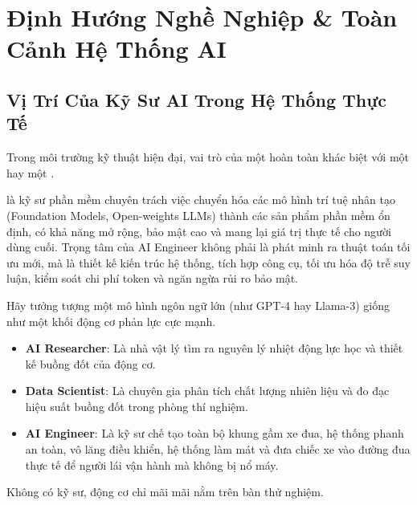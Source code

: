
\chapter{Định Hướng Nghề Nghiệp \& Toàn Cảnh Hệ Thống AI}
\label{ch:phase0-overview}

\section{Vị Trí Của Kỹ Sư AI Trong Hệ Thống Thực Tế}
\label{sec:ai-engineer-role}

Trong môi trường kỹ thuật hiện đại, vai trò của một  hoàn toàn khác biệt với một  hay một .

\begin{definitionbox}
 là kỹ sư phần mềm chuyên trách việc chuyển hóa các mô hình trí tuệ nhân tạo (Foundation Models, Open-weights LLMs) thành các sản phẩm phần mềm ổn định, có khả năng mở rộng, bảo mật cao và mang lại giá trị thực tế cho người dùng cuối. Trọng tâm của AI Engineer không phải là phát minh ra thuật toán tối ưu mới, mà là thiết kế kiến trúc hệ thống, tích hợp công cụ, tối ưu hóa độ trễ suy luận, kiểm soát chi phí token và ngăn ngừa rủi ro bảo mật.
\end{definitionbox}

\begin{intuitionbox}
Hãy tưởng tượng một mô hình ngôn ngữ lớn (như GPT-4 hay Llama-3) giống như một khối động cơ phản lực cực mạnh.
\begin{itemize}
  \item \textbf{AI Researcher}: Là nhà vật lý tìm ra nguyên lý nhiệt động lực học và thiết kế buồng đốt của động cơ.
  \item \textbf{Data Scientist}: Là chuyên gia phân tích chất lượng nhiên liệu và đo đạc hiệu suất buồng đốt trong phòng thí nghiệm.
  \item \textbf{AI Engineer}: Là kỹ sư chế tạo toàn bộ khung gầm xe đua, hệ thống phanh an toàn, vô lăng điều khiển, hệ thống làm mát và đưa chiếc xe vào đường đua thực tế để người lái vận hành mà không bị nổ máy.
\end{itemize}
Không có kỹ sư, động cơ chỉ mãi mãi nằm trên bàn thử nghiệm.
\end{intuitionbox}

